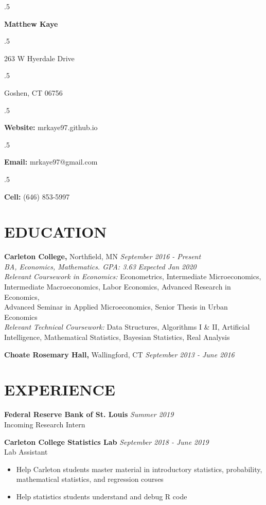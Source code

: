 \documentclass[margin, 9pt]{res} %
\begin{document}

\moveleft.5\hoffset\centerline{\large\bf Matthew Kaye} %
  
\moveleft.5\hoffset\centerline{263 W Hyerdale Drive}
\moveleft.5\hoffset\centerline{Goshen, CT 06756}
\medskip
\moveleft.5\hoffset\centerline{\textbf{Website:} mrkaye97.github.io}
\moveleft.5\hoffset\centerline{\textbf{Email:} mrkaye97@gmail.com} %
\moveleft.5\hoffset\centerline{\textbf{Cell:} (646) 853-5997}


\begin{resume}


\singlespacing
\section{EDUCATION}

{\sl} \textbf{Carleton College,} Northfield, MN \hfill \textit{September 2016 - Present}\smallskip\\
{\sl BA, Economics, Mathematics. GPA: 3.63} \hfill \textit{Expected Jan 2020}\smallskip\\
{\sl Relevant Coursework in Economics: } Econometrics, Intermediate Microeconomics, Intermediate Macroeconomics, Labor Economics, Advanced Research in Economics,\\Advanced Seminar in Applied Microeconomics, Senior Thesis in Urban Economics\smallskip\\
{\sl Relevant Technical Coursework: } Data Structures, Algorithms I \& II, Artificial Intelligence, Mathematical Statistics, Bayesian Statistics, Real Analysis

{\sl} \textbf{Choate Rosemary Hall,} Wallingford, CT \hfill \textit{September 2013 - June 2016}

\section{EXPERIENCE}
{\sl} \textbf{Federal Reserve Bank of St. Louis} \hfill \textit{Summer 2019}\smallskip\\
{\sl} Incoming Research Intern \smallskip


{\sl} \textbf{Carleton College Statistics Lab} \hfill \textit{September 2018 - June 2019}\\
{\sl} Lab Assistant \smallskip
{\sl} \begin{itemize}
\item Help Carleton students master material in introductory statistics, probability, mathematical statistics, and regression courses
\item Help statistics students understand and debug R code
\end{itemize}


\end{resume}
\end{document}

